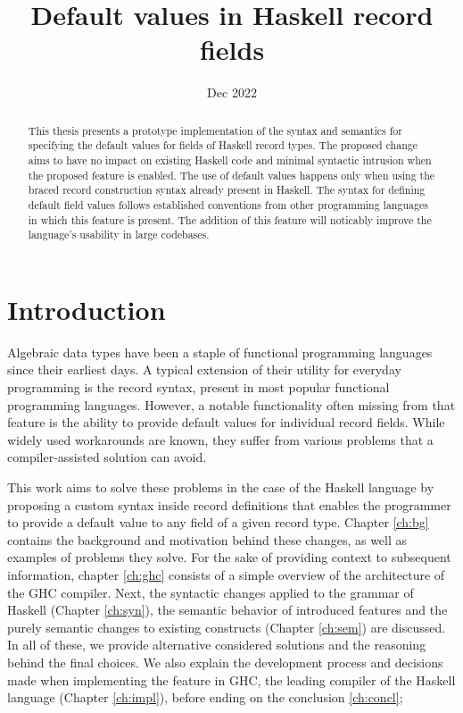 \documentclass[en]{pracamgr}
\title{Default values in Haskell record fields}
\date{Dec 2022}
\begin{document}
\maketitle

\begin{abstract}
This thesis presents a prototype implementation of the syntax and semantics for specifying
the default values for fields of Haskell record types. The proposed change aims to have no 
impact on existing Haskell code and minimal syntactic intrusion when the proposed feature 
is enabled. The use of default values happens only when using the braced record construction syntax 
already present in Haskell. The syntax for defining default field values follows established
conventions from other programming languages in which this feature is present. The addition
of this feature will noticably improve the language's usability in large codebases.
\end{abstract}

\tableofcontents

\chapter*{Introduction}

Algebraic data types have been a staple of functional programming languages since their earliest days.
A typical extension of their utility for everyday programming is the record syntax, present in most popular functional programming languages.
However, a notable functionality often missing from that feature is the ability to provide default values for individual record fields.
While widely used workarounds are known, they suffer from various problems that a compiler-assisted solution can avoid.

This work aims to solve these problems in the case of the Haskell language \cite{HudakHaskell}
by proposing a custom syntax inside record definitions that enables the programmer to provide a default value to any field of a given record type.
Chapter \ref*{ch:bg} contains the background and motivation behind these changes, as well as examples of problems they solve.
For the sake of providing context to subsequent information, chapter \ref*{ch:ghc}
consists of a simple overview of the architecture of the GHC compiler.
Next, the syntactic changes applied to the grammar of Haskell (Chapter \ref*{ch:syn}), 
the semantic behavior of introduced features 
and the purely semantic changes to existing constructs (Chapter \ref*{ch:sem}) are discussed.
In all of these, we provide alternative considered solutions and the reasoning behind the final choices.
We also explain the development process and decisions made when implementing the feature in GHC, 
the leading compiler of the Haskell language (Chapter \ref*{ch:impl}),
before ending on the conclusion \ref*{ch:concl};
\end{document}
